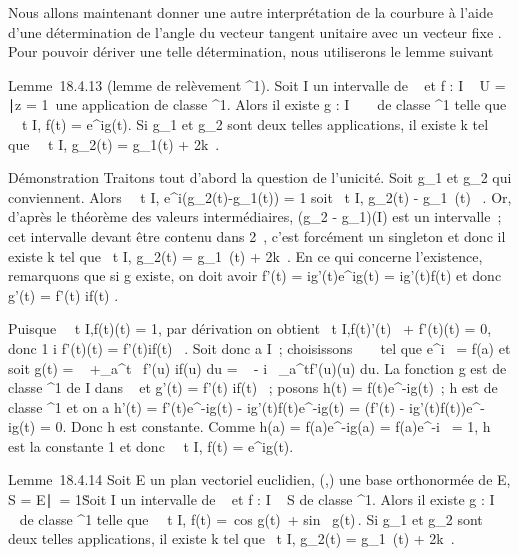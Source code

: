 \documentclass[]{article}
\begin{document}
Nous allons maintenant donner une autre interprétation de la courbure à
l'aide d'une détermination de l'angle \phi du vecteur tangent unitaire
\vect avec un vecteur fixe \vec\imath.
Pour pouvoir dériver une telle détermination, nous utiliserons le lemme
suivant

Lemme~18.4.13 (lemme de relèvement ^1). Soit I un intervalle
de ~ et f : I \rightarrow~ U = \z \in
{}∣z = 1\
une application de classe ^1. Alors il existe g : I \rightarrow~ ~ de
classe \mathcal{C}^1 telle que \forall~~t \in I, f(t) =
e^ig(t). Si g_1 et g_2 sont deux telles
applications, il existe k \in {} tel que \forall~~t \in I,
g_2(t) = g_1(t) + 2k\pi~.

Démonstration Traitons tout d'abord la question de l'unicité. Soit
g_1 et g_2 qui conviennent. Alors
\forall~~t \in I,
e^i(g_2(t)-g_1(t)) = 1 soit
\forall~t \in I, g_2(t) - g_1~(t) \pi~. Or, d'après le théorème des valeurs intermédiaires, (g_2 -
g_1)(I) est un intervalle~; cet intervalle devant être contenu
dans 2\pi~, c'est forcément un singleton et donc il existe k \in {} tel que
\forall~t \in I, g_2(t) = g_1~(t) +
2k\pi~. En ce qui concerne l'existence, remarquons que si g existe, on doit
avoir f'(t) = ig'(t)e^ig(t) = ig'(t)f(t) et donc g'(t) =
f'(t) \over if(t) .

Puisque \forall~~t \in
I,f(t)\overlinef(t) = 1, par dérivation on obtient
\forall~t \in I,f(t)\overlinef'(t)~ +
f'(t)\overlinef(t) = 0, donc  1
\over i f'(t)\overlinef(t) =
f'(t)\over if(t) \in {}~. Soit donc a \in I~; choisissons \alpha~
\in \mathbb{R}~ tel que e^i\alpha~ = f(a) et soit g(t) = \alpha~
+\int  _a^t~ f'(u)
\over if(u) du = \alpha~ - i\int ~
_a^tf'(u)\overlinef(u) du. La fonction
g est de classe ^1 de I dans ~ et g'(t) = f'(t)
\over if(t) ~; posons h(t) = f(t)e^-ig(t)~;
h est de classe ^1 et on a h'(t) = f'(t)e^-ig(t)
- ig'(t)f(t)e^-ig(t) = \left (f'(t) -
ig'(t)f(t)\right )e^-ig(t) = 0. Donc h est
constante. Comme h(a) = f(a)e^-ig(a) = f(a)e^-i\alpha~ =
1, h est la constante 1 et donc \forall~~t \in I, f(t) =
e^ig(t).

Lemme~18.4.14 Soit E un plan vectoriel euclidien,
(\vec\imath,) une base orthonormée
de E, S = \x \in
E∣\x\
= 1\. Soit I un intervalle de ~ et f : I \rightarrow~ S de classe
^1. Alors il existe g : I \rightarrow~ ~ de classe ^1 telle
que \forall~~t \in I, f(t) =\
cos g(t)\,\vec\imath
+ sin~
g(t)\,. Si g_1 et
g_2 sont deux telles applications, il existe k \in {} tel que
\forall~t \in I, g_2(t) = g_1~(t) +
2k\pi~.
\end{document}
